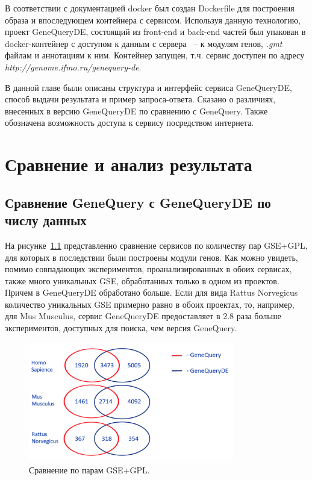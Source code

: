 \documentclass[times,specification,annotation]{itmo-student-thesis}
\begin{document}
В соответствии с документацией docker \cite{DockerDock} был создан Dockerfile для построения образа и впоследующем контейнера с сервисом. Используя данную технологию, проект GeneQueryDE, состоящий из front-end и back-end частей был упакован в docker-контейнер с доступом к данным с сервера ~-- к модулям генов, \textit{.gmt} файлам и аннотациям к ним. Контейнер запущен, т.ч. сервис доступен по адресу \textit{http://genome.ifmo.ru/genequery-de}.  

\chapterconclusion

В данной главе были описаны структура и интерфейс сервиса GeneQueryDE, способ выдачи результата и пример запроса-ответа. Сказано о различиях, внесенных в версию GeneQueryDE по сравнению с GeneQuery. Также обозначена возможность доступа к сервису посредством интернета. 

\chapter{Сравнение и анализ результата}

\section{Сравнение GeneQuery с GeneQueryDE по числу данных}

На рисунке~\ref{GSEnumbers} представленно сравнение сервисов по количеству пар GSE+GPL, для которых в последствии были построены модули генов. Как можно увидеть, помимо совпадающих экспериментов, проанализированных в обоих сервисах, также много уникальных GSE, обработанных только в одном из проектов. Причем в GeneQueryDE обработано больше. Если для вида Rattus Norvegicus количество уникальных GSE примерно равно в обоих проектах, то, например, для Mus Musculus, сервис GeneQueryDE предоставляет в 2.8 раза больше экспериментов, доступных для поиска, чем версия GeneQuery. 

\begin{figure}[!h]
    \caption{Сравнение по парам GSE+GPL.}\label{GSEnumbers}
    \centering
    \includegraphics[width=0.8\textwidth]{GSEnumbers}
\end{figure}
\end{document}
